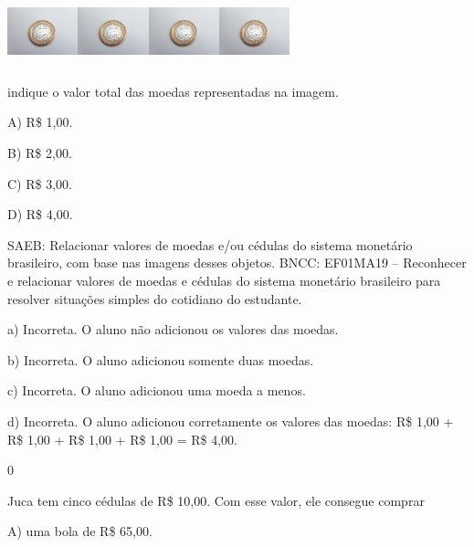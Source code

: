 \includegraphics[width=0.80577in,height=0.79447in]{media/image60.jpg}\includegraphics[width=0.80577in,height=0.79447in]{media/image60.jpg}\includegraphics[width=0.80577in,height=0.79447in]{media/image60.jpg}\includegraphics[width=0.80577in,height=0.79447in]{media/image60.jpg}

indique o valor total das moedas representadas na imagem.

A) R\$ 1,00.

B) R\$ 2,00.

C) R\$ 3,00.

D) R\$ 4,00.

SAEB: Relacionar valores de moedas e/ou cédulas do sistema
monetário brasileiro, com base nas imagens desses objetos.
BNCC: EF01MA19 -- Reconhecer e relacionar valores de moedas e cédulas do
sistema monetário brasileiro para resolver situações simples do
cotidiano do estudante.

a) Incorreta. O aluno não adicionou os valores das moedas.

b) Incorreta. O aluno adicionou somente duas moedas.

c) Incorreta. O aluno adicionou uma moeda a menos.

d) Incorreta. O aluno adicionou corretamente os valores das moedas:
R\$ 1,00 + R\$ 1,00 + R\$ 1,00 + R\$ 1,00 = R\$ 4,00.

\num{0}

Juca tem cinco cédulas de R\$ 10,00. Com esse valor, ele consegue comprar

A) uma bola de R\$ 65,00.

